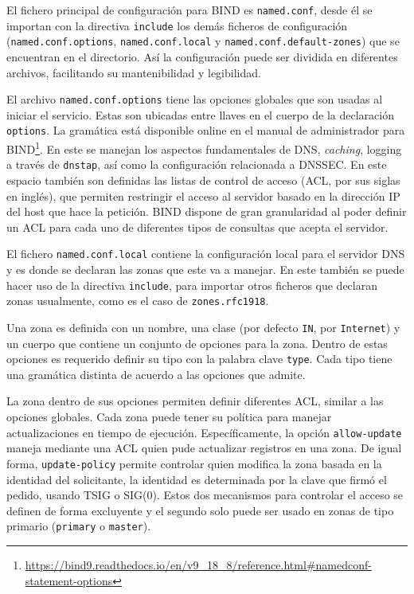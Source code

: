El fichero principal de configuración para BIND es \verb+named.conf+, desde él se importan con la directiva \verb+include+ los demás ficheros de configuración (\verb|named.conf.options|, \verb|named.conf.local| y \verb|named.conf.default-zones|) que se encuentran en el directorio. Así la configuración puede ser dividida en diferentes archivos, facilitando su mantenibilidad y legibilidad.

El archivo \verb+named.conf.options+ tiene las opciones globales que son usadas al iniciar el servicio. Estas son ubicadas entre llaves en el cuerpo de la declaración \verb+options+. La gramática está disponible online en el manual de administrador para BIND\footnote{\url{https://bind9.readthedocs.io/en/v9_18_8/reference.html\#namedconf-statement-options}}. En este se manejan los aspectos fundamentales de DNS, \textit{caching}, logging a través de \verb+dnstap+, así como la configuración relacionada a DNSSEC. En este espacio también son definidas las listas de control de acceso (ACL, por sus siglas en inglés), que permiten restringir el acceso al servidor basado en la dirección IP del host que hace la petición. BIND dispone de gran granularidad al poder definir un ACL para cada uno de diferentes tipos de consultas que acepta el servidor.

El fichero \verb+named.conf.local+ contiene la configuración local para el servidor DNS y es donde se declaran las zonas que este va a manejar. En este también se puede hacer uso de la directiva \verb+include+, para importar otros ficheros que declaran zonas usualmente, como es el caso de \verb+zones.rfc1918+.

Una zona es definida con un nombre, una clase (por defecto \verb+IN+, por \verb+Internet+) y un cuerpo que contiene un conjunto de opciones para la zona. Dentro de estas opciones es requerido definir su tipo con la palabra clave \verb+type+. Cada tipo tiene una gramática distinta de acuerdo a las opciones que admite.

La zona dentro de sus opciones permiten definir diferentes ACL, similar a las opciones globales. Cada zona puede tener su política para manejar actualizaciones en tiempo de ejecución. Específicamente, la opción \verb+allow-update+ maneja mediante una ACL quien pude actualizar registros en una zona. De igual forma, \verb+update-policy+ permite controlar quien modifica la zona basada en la identidad del solicitante, la identidad es determinada por la clave que firmó el pedido, usando TSIG o SIG(0). Estos dos mecanismos para controlar el acceso se definen de forma excluyente y el segundo solo puede ser usado en zonas de tipo primario (\verb+primary+ o \verb+master+).

